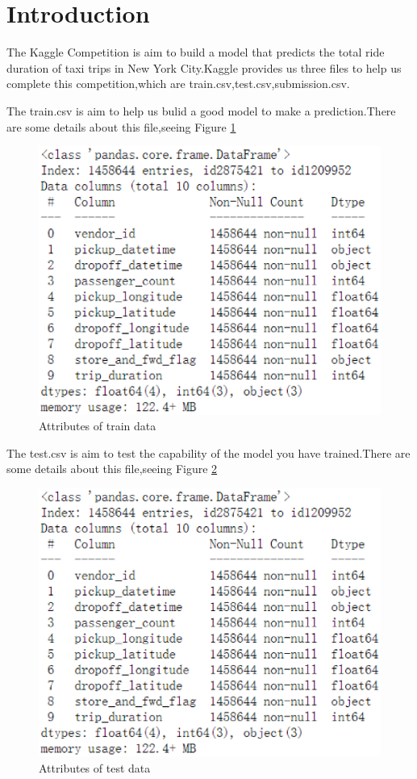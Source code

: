 \section{Introduction}\label{sec-intro}
\par
The Kaggle Competition is aim to build a model that predicts the total ride duration of taxi trips in New York City.Kaggle provides us three files to help us complete this competition,which are train.csv,test.csv,submission.csv.
\par
The train.csv is aim to help us bulid a good model to make a prediction.There are some details about this file,seeing Figure \ref{five}
\begin{figure}[htbp]
	\centering
	\includegraphics[scale=0.5]{figures/five.eps}
	\caption{Attributes of train data} \label{five}
\end{figure}
\par
The test.csv is aim to test the capability of the model you have trained.There are some details about this file,seeing Figure \ref{six}
\begin{figure}[htbp]
	\centering
	\includegraphics[scale=0.5]{figures/five.eps}
	\caption{Attributes of test data} \label{six}
\end{figure}
